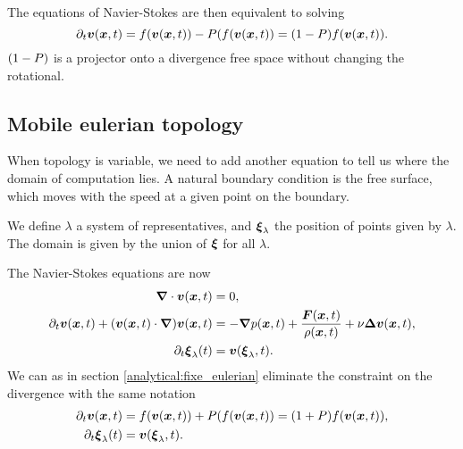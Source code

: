 The equations of Navier-Stokes are then equivalent to solving
\begin{equation}
  \partial_t {\boldsymbol {v}}({\boldsymbol {x}} ,t)=f({\boldsymbol {v}}({\boldsymbol {x}},t))-P(f({\boldsymbol {v}}({\boldsymbol {x}},t))=(1-P)f({\boldsymbol {v}}({\boldsymbol {x}},t)).
\end{equation}
$(1-P)$ is a projector onto a divergence free space without changing the rotational.

\subsection{Mobile eulerian topology }
When topology is variable, we need to add another equation to tell us where the domain of computation lies.
A natural boundary condition is the free surface, which moves with the speed at a given point on the boundary.

We define $\lambda$ a system of representatives, and ${\boldsymbol {\xi}}_{\lambda}$ the position of points given by $\lambda$.
The domain is given by the union of ${\boldsymbol {\xi}}$ for all $\lambda$.

The Navier-Stokes equations are now
\begin{subequations}
\begin{align}
\label{analytical:navierStokesMobA}
{\boldsymbol {\nabla}} \cdot {\boldsymbol {v}}({\boldsymbol {x}} ,t)&=0,\\
\label{analytical:navierStokesMobB}
\partial_t {\boldsymbol {v}}({\boldsymbol {x}} ,t)+({\boldsymbol {v}}({\boldsymbol {x}},t)\cdot{\boldsymbol {\nabla}} ) {\boldsymbol {v}}({\boldsymbol {x}} ,t)&=-{\boldsymbol {\nabla}} p({\boldsymbol {x}},t)+\frac{{\boldsymbol {F}}({\boldsymbol {x}},t)}{\rho({\boldsymbol {x}},t)}+\nu {\boldsymbol {\Delta}} {\boldsymbol {v}}({\boldsymbol {x}},t),\\
\partial_t {\boldsymbol {\xi}}_{\lambda}(t)&={\boldsymbol {v}}({\boldsymbol {\xi}}_{\lambda},t).
\end{align}
\end{subequations}
We can as in section \ref{analytical:fixe_eulerian} eliminate the constraint on the divergence with the same notation
\begin{subequations}
\begin{align}
\partial_t {\boldsymbol {v}}({\boldsymbol {x}} ,t)&=f({\boldsymbol {v}}({\boldsymbol {x}},t))+P(f({\boldsymbol {v}}({\boldsymbol {x}},t))=(1+P)f({\boldsymbol {v}}({\boldsymbol {x}},t)),\\
\partial_t {\boldsymbol {\xi}}_{\lambda}(t)&={\boldsymbol {v}}({\boldsymbol {\xi}}_{\lambda},t)\label{ana:move:equ}.
\end{align}
\end{subequations}

